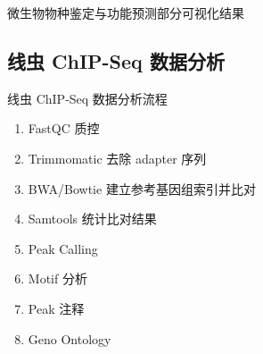 \documentclass{beamer}
\begin{document}
	\begin{frame}{微生物物种鉴定与功能预测}{部分可视化结果}
		\begin{figure}
		\end{figure}
	\end{frame}

	\subsection{线虫 ChIP-Seq 数据分析}
	\begin{frame}{线虫 ChIP-Seq 数据分析}{流程}
		\begin{enumerate}
			\item FastQC 质控
			\item Trimmomatic 去除 adapter 序列
			\item BWA/Bowtie 建立参考基因组索引并比对
			\item Samtools 统计比对结果
			\item Peak Calling
			\item Motif 分析
			\item Peak 注释
			\item Geno Ontology
		\end{enumerate}
	\end{frame}
\end{document}

